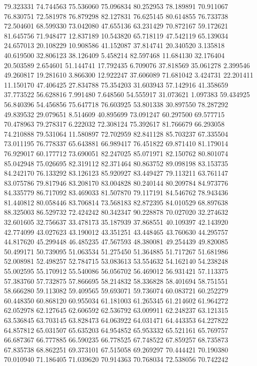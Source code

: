 79.323331
74.744563
75.536060
75.096834
80.252953
78.189891
70.911067
76.830751
72.581978
76.879298
82.127831
76.625145
80.614855
76.733738
72.504601
68.599330
73.042080
47.655136
63.231429
70.872167
59.172621
81.645756
71.948477
12.837189
10.543820
65.718119
47.542119
65.139034
24.657013
20.108229
10.908586
41.152087
37.814741
20.340520
3.135818
40.619500
32.806123
38.126409
5.458214
82.597468
11.684130
32.176404
20.503589
2.654601
51.144741
17.792435
6.709076
37.818569
35.061278
2.399546
49.260817
19.281610
3.866300
12.922247
37.606089
71.681042
3.424731
22.201411
11.150170
47.406425
27.834788
75.354203
31.603943
57.142916
41.358659
37.773522
56.628816
7.991480
7.648560
54.555917
31.073621
1.097383
59.434925
56.840396
54.456856
75.647718
76.603925
53.801338
30.897550
78.287292
49.839532
29.079651
8.514609
40.895699
73.091247
60.297500
69.577715
70.478963
79.278317
6.222032
72.308124
75.392617
81.766679
66.293058
74.210888
79.531064
11.580897
72.702959
82.841128
85.703237
67.335504
73.011195
76.778337
65.643881
66.989417
76.451822
69.871410
81.179014
76.929017
60.177712
73.690051
82.247025
85.071971
82.150762
80.801074
85.042948
75.026695
82.319112
82.371464
80.863752
89.098198
83.153735
84.242170
76.133292
83.126123
85.920927
83.449427
79.113211
63.761147
83.075786
79.817946
83.208170
83.004828
80.240144
80.209784
84.973776
84.335779
86.717092
83.469033
81.507870
79.117191
84.546762
78.943436
81.440812
80.058446
83.706814
73.568183
82.872395
84.010529
68.897638
88.325003
86.529732
72.424242
80.342347
90.228878
70.027020
32.274632
32.601605
32.756637
33.478173
35.187939
37.868551
40.109397
42.143920
42.774099
43.027623
43.190012
43.351251
43.448465
43.760630
44.295757
44.817620
45.299448
46.485235
47.567593
48.380081
49.254439
49.820085
50.499171
50.739095
51.063534
51.275450
51.364885
51.717267
51.681986
52.008981
52.498257
52.784715
53.083613
53.554632
54.162140
54.238248
55.002595
55.170912
55.540086
56.056702
56.469012
56.931421
57.113375
57.383760
57.732875
57.866695
58.214832
58.336828
58.401694
58.751551
58.666280
59.113082
59.409565
59.693071
59.736074
60.083721
60.252279
60.448350
60.868120
60.955034
61.181003
61.265345
61.214602
61.964272
62.052978
62.127645
62.606592
62.536792
63.009911
62.248237
63.121315
63.536845
63.703145
63.828473
64.063922
64.031471
64.443353
64.227822
64.857812
65.031507
65.635203
64.954852
65.953332
65.521161
65.769757
66.687367
66.777885
66.590235
66.778525
67.748522
67.859257
68.735873
67.835738
68.862251
69.373101
67.515058
69.269297
70.444421
70.190380
70.010940
71.186405
71.039620
70.914363
70.768034
72.538056
70.742242
